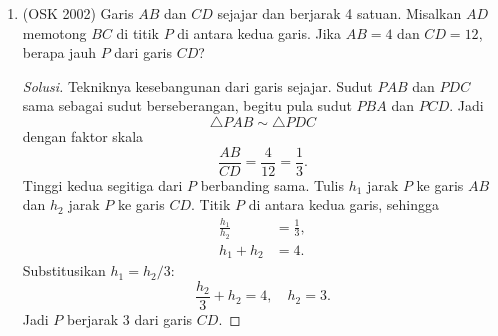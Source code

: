 \documentclass[12pt]{scrartcl}
\begin{document}
\begin{enumerate}[resume]

	\item (OSK 2002)
	Garis $AB$ dan $CD$ sejajar dan berjarak 4 satuan. Misalkan $AD$
	memotong $BC$ di titik $P$ di antara kedua garis. Jika $AB=4$ dan
	$CD=12$, berapa jauh $P$ dari garis $CD$?
\begin{center}
\end{center}
	\begin{proof}[Solusi]
	Tekniknya kesebangunan dari garis sejajar. Sudut $PAB$ dan $PDC$
	sama sebagai sudut berseberangan, begitu pula sudut $PBA$ dan
	$PCD$. Jadi
	\[ \triangle PAB \sim \triangle PDC \]
	dengan faktor skala
	\[ \frac{AB}{CD} = \frac{4}{12} = \frac13. \]
	Tinggi kedua segitiga dari $P$ berbanding sama. Tulis $h_{1}$
	jarak $P$ ke garis $AB$ dan $h_{2}$ jarak $P$ ke garis $CD$.
	Titik $P$ di antara kedua garis, sehingga
	\begin{align*}
	\frac{h_{1}}{h_{2}} &= \frac13, \\
	h_{1} + h_{2} &= 4.
	\end{align*}
	Substitusikan $h_{1} = h_{2}/3$:
	\[ \frac{h_{2}}{3} + h_{2} = 4, \quad h_{2} = 3. \]
	Jadi $P$ berjarak $3$ dari garis $CD$.
	\end{proof}


\end{enumerate}
\end{document}
